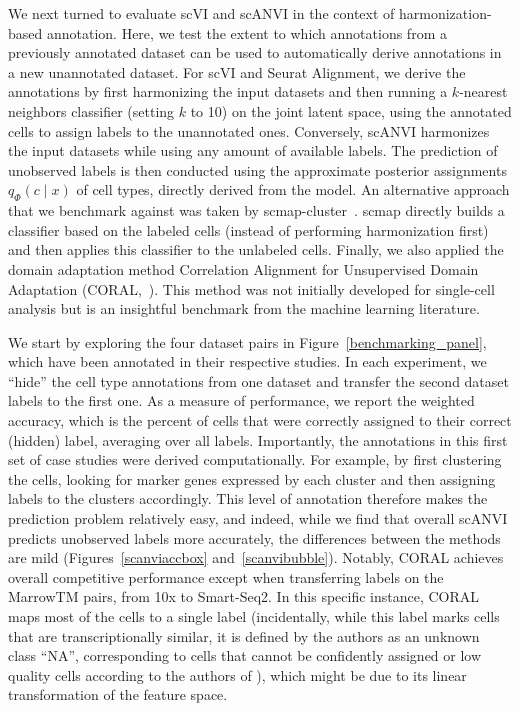 We next turned to evaluate scVI and scANVI in the context of harmonization-based annotation. Here, we test the extent to which annotations from a previously annotated dataset can be used to automatically derive annotations in a new unannotated dataset. For scVI and Seurat Alignment, we derive the annotations by first harmonizing the input datasets and then running a $k$-nearest neighbors classifier (setting $k$ to 10) on the joint latent space, using the annotated cells to assign labels to the unannotated ones. Conversely, scANVI harmonizes the input datasets while using any amount of available labels. The prediction of unobserved labels is then conducted using the approximate posterior assignments $q_\Phi(c \mid x)$ of cell types, directly derived from the model. An alternative approach that we benchmark against was taken by scmap-cluster~\cite{scmap}. scmap directly builds a classifier based on the labeled cells (instead of performing harmonization first) and then applies this classifier to the unlabeled cells. Finally, we also applied the domain adaptation method Correlation Alignment for Unsupervised Domain Adaptation (CORAL,~\cite{sun2016return}). This method was not initially developed for single-cell analysis but is an insightful benchmark from the machine learning literature.

We start by exploring the four dataset pairs in Figure~\ref{benchmarking_panel}, which have been annotated in their respective studies. In each experiment, we ``hide'' the cell type annotations from one dataset and transfer the second dataset labels to the first one. As a measure of performance, we report the weighted accuracy, which is the percent of cells that were correctly assigned to their correct (hidden) label, averaging over all labels. Importantly, the annotations in this first set of case studies were derived computationally. For example, by first clustering the cells, looking for marker genes expressed by each cluster and then assigning labels to the clusters accordingly. This level of annotation therefore makes the prediction problem relatively easy, and indeed, while we find that overall scANVI predicts unobserved labels more accurately, the differences between the methods are mild (Figures~\ref{scanviaccbox} and~\ref{scanvibubble}). Notably, CORAL achieves overall competitive performance except when transferring labels on the MarrowTM pairs, from 10x to Smart-Seq2. In this specific instance, CORAL maps most of the cells to a single label (incidentally, while this label marks cells that are transcriptionally similar, it is defined by the authors as an unknown class ``NA'', corresponding to cells that cannot be confidently assigned or low quality cells according to the authors of \cite{quake2018single}), which might be due to its linear transformation of the feature space. 



